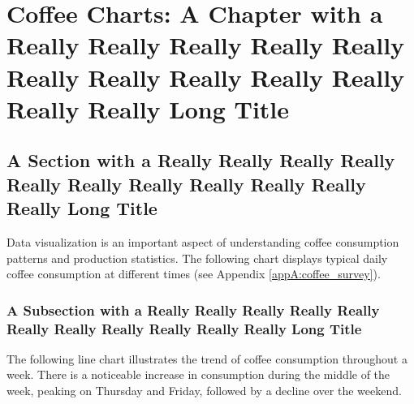\chapter{Coffee Charts: A Chapter with a Really Really Really Really Really Really Really Really Really Really Really Really Long Title}

\section{A Section with a Really Really Really Really Really Really Really Really Really Really Really Long Title}
Data visualization is an important aspect of understanding coffee consumption
patterns and production statistics. The following chart displays typical daily
coffee consumption at different times (see Appendix \ref{appA:coffee_survey}).

\subsection{A Subsection with a Really Really Really Really Really Really Really Really Really Really Really Long Title}
The following line chart illustrates the trend of coffee consumption throughout
a week. There is a noticeable increase in consumption during the middle of the
week, peaking on Thursday and Friday, followed by a decline over the weekend.
